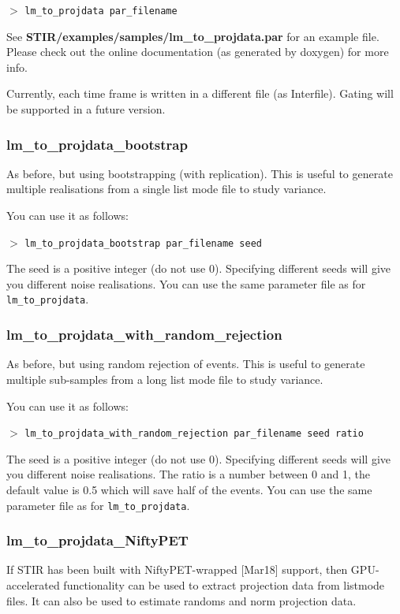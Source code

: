 \documentclass{article}
\newcommand{\cmdline}[1]{\par \noindent $>$ \texttt{#1}\par}
\begin{document}
\cmdline{lm\_to\_projdata par\_filename}


See \textbf{STIR/examples/samples/lm\_to\_projdata.par} for an example file. Please 
check out the online documentation (as generated by doxygen) 
for more info.

Currently, each time frame is written in a different file (as Interfile). Gating 
will be supported in a future version.

\subsubsection{
lm\_to\_projdata\_bootstrap}
As before, but using bootstrapping (with replication). This is useful to generate multiple realisations 
from a single list mode file to study variance.

You can use it as follows:

\cmdline{lm\_to\_projdata\_bootstrap par\_filename seed}

The seed is a positive integer (do not use $0$). Specifying different seeds will give you different noise realisations.
You can use the same parameter file as for \texttt{lm\_to\_projdata}.

\subsubsection{
lm\_to\_projdata\_with\_random\_rejection}
As before, but using random rejection of events. This is useful to generate multiple sub-samples 
from a long list mode file to study variance.

You can use it as follows:

\cmdline{lm\_to\_projdata\_with\_random\_rejection par\_filename seed ratio}

The seed is a positive integer (do not use $0$). Specifying different seeds will give you different noise realisations. The ratio is a number between 0 and 1, the default value is 0.5 which will save half of the events.
You can use the same parameter file as for \texttt{lm\_to\_projdata}.

\subsubsection{
lm\_to\_projdata\_NiftyPET}
If STIR has been built with NiftyPET-wrapped [Mar18] support, then GPU-accelerated functionality can be used to extract projection data from listmode files. It can also be used to estimate randoms and norm projection data.
\end{document}
